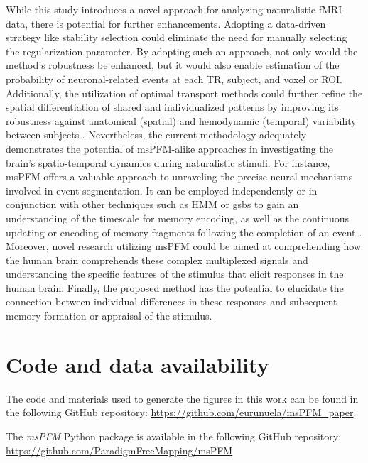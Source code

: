 While this study introduces a novel approach for analyzing naturalistic fMRI
data, there is potential for further enhancements. Adopting a data-driven
strategy like stability selection
\citep{Meinshausen2010Stabilityselection, Urunuela2022Wholebrainmultivariate}
could eliminate the need for manually selecting the regularization parameter. By
adopting such an approach, not only would the method's robustness be enhanced,
but it would also enable estimation of the probability of neuronal-related
events at each TR, subject, and voxel or ROI. Additionally, the utilization of
optimal transport methods could further refine the spatial differentiation of
shared and individualized patterns by improving its robustness against
anatomical (spatial) and hemodynamic (temporal) variability between subjects
\citep{Janati2020MultisubjectMEG/EEG}. Nevertheless, the current methodology
adequately demonstrates the potential of msPFM-alike approaches in investigating
the brain's spatio-temporal dynamics during naturalistic stimuli. For instance,
msPFM offers a valuable approach to unraveling the precise neural mechanisms
involved in event segmentation. It can be employed independently or in
conjunction with other techniques such as HMM or \acrshort*{gsbs} to gain an
understanding of the timescale for memory encoding, as well as the continuous
updating or encoding of memory fragments following the completion of an event
\citep{Baldassano2017DiscoveringEventStructure,
Silva2019RapidMemoryReactivation}. Moreover, novel research utilizing msPFM
could be aimed at comprehending how the human brain comprehends these complex
multiplexed signals and understanding the specific features of the stimulus that
elicit responses in the human brain. Finally, the proposed method has the
potential to elucidate the connection between individual differences in these
responses and subsequent memory formation or appraisal of the stimulus.

\section{Code and data availability}
\label{sec:multi_subject_github}
The code and materials used to generate the figures in this work can be found in the following
GitHub repository:
\url{https://github.com/eurunuela/msPFM\_paper}.

The \textit{msPFM} Python package is available in the following GitHub repository:
\url{https://github.com/ParadigmFreeMapping/msPFM}
